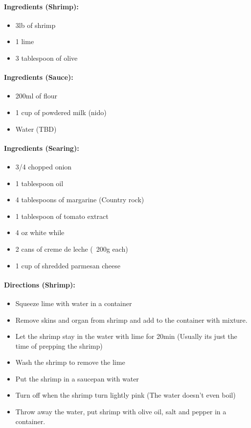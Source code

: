 \documentclass{article}
\begin{document}
\paragraph{Ingredients (Shrimp):}
\begin{itemize}
    \item 3lb of shrimp
    \item 1 lime
    \item 3 tablespoon of olive
\end{itemize}  

\paragraph{Ingredients (Sauce):}
\begin{itemize}
    \item 200ml of flour
    \item 1 cup of powdered milk (nido)
    \item Water (TBD)
\end{itemize}  

\paragraph{Ingredients (Searing):}
\begin{itemize}
    \item 3/4 chopped onion
    \item 1 tablespoon oil
    \item 4 tablespoons of margarine (Country rock)
    \item 1 tablespoon of tomato extract
    \item 4 oz white while
    \item 2 cans of creme de leche (~200g each)
    \item 1 cup of shredded parmesan cheese
\end{itemize}  

\paragraph{Directions (Shrimp):}
\begin{itemize}
    \item Squeeze lime with water in a container
    \item Remove skins and organ from shrimp and add to the container with mixture.
    \item Let the shrimp stay in the water with lime for 20min (Usually its just the time of prepping the shrimp)
    \item Wash the shrimp to remove the lime
    \item Put the shrimp in a saucepan with water
    \item Turn off when the shrimp turn lightly pink (The water doesn't even boil)
    \item Throw away the water, put shrimp with olive oil, salt and pepper in a container.
\end{itemize}  
\end{document}
